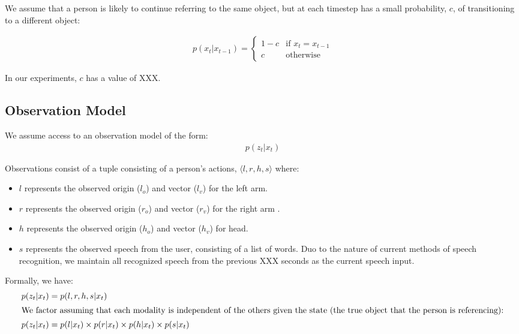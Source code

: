 \documentclass[letterpaper, 10 pt, conference]{ieeeconf}
\newcommand{\stnote}[1]{\textcolor{Blue}{\textbf{ST: #1}}}
\begin{document}
We assume that a person is likely to continue referring to the same
object, but at each timestep has a small probability, $c$, of
transitioning to a different object: 

\begin{align}
p(x_t | x_{t-1}) = \left\{  \begin{array}{ll}
1-c &\mbox{if } x_t = x_{t-1}\\
c &\mbox{otherwise}
\end{array}\right.
\end{align}

In our experiments, $c$ has a value of XXX.


\subsection{Observation Model}

We assume access to an observation model of the form:
\begin{align}
p(z_t | x_t)
\end{align}

Observations consist of a tuple consisting of a person's actions,
$\langle l, r, h, s\rangle $ where:
\begin{itemize}
	\item $l$ represents the observed origin ($l_o$) and vector ($l_v$) for the left arm.
	\item $r$ represents the observed origin  ($r_o$) and vector ($r_v$)  for the right arm .
	\item $h$ represents the observed origin  ($h_o$) and vector ($h_v$)  for head.
	\item $s$ represents the observed speech from the user,
          consisting of a list of words. Duo to the nature of current
          methods of speech recognition, we maintain all recognized
          speech from the previous XXX seconds as the current speech
          input.
	\end{itemize}

Formally, we have:
\begin{align}
p(z_t | x_t) &= p(l, r, h, s | x_t)\\
\intertext{We factor assuming that each modality is independent of the others given the state (the true object that the person is referencing):}
p(z_t | x_t) &= p(l | x_t) \times p(r | x_t) \times p(h | x_t) \times p(s | x_t)
\end{align}
\end{document}
